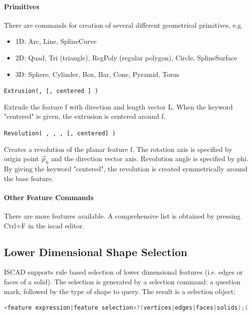 \paragraph{Primitives}

There are commands for creation of several different geometrical
primitives, e.g.
\begin{itemize}
\item 1D: Arc, Line, SplineCurve
\item 2D: Quad, Tri (triangle), RegPoly (regular polygon), Circle,
    SplineSurface
\item 3D: Sphere, Cylinder, Box, Bar, Cone, Pyramid, Torus
\end{itemize}


\texttt{Extrusion(,  [, centered ] )}

Extrude the feature f with direction and length vector L. When the
keyword "centered" is given, the extrusion is centered around f.

\texttt{Revolution( , , ,  [, centered] )}

Creates a revolution of the planar feature f. The rotation axis is
specified by origin point $\vec p_0$ and the direction vector axis.
Revolution angle is specified by phi. By giving the keyword
"centered", the revolution is created symmetrically around the base
feature.

\paragraph{Other Feature Commands}

There are more features available. A comprehensive list is obtained by
pressing Ctrl+F in the iscad editor.

\subsection{Lower Dimensional Shape Selection}

ISCAD supports rule based selection of lower dimensional features (i.e. edges or faces of a solid). 
The selection is generated by a selection command: a question mark, followed
by the type of shape to query. 
The result is a selection object:

\begin{lstlisting}[language=c++]
<feature expression|feature selection>?(vertices|edges|faces|solids);('<command string>' [, parameter 0 [, ..., parameter n] ] )
\end{lstlisting}

